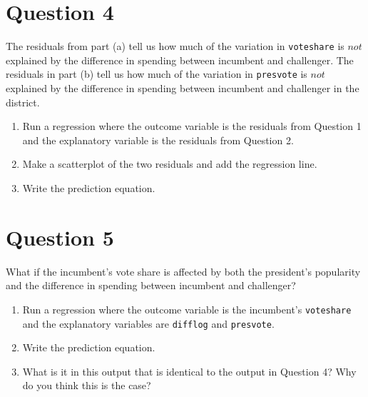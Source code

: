 \documentclass[12pt,letterpaper]{article}
\begin{document}
\section*{Question 4}
\noindent The residuals from part (a) tell us how much of the variation in \texttt{voteshare} is $not$ explained by the difference in spending between incumbent and challenger. The residuals in part (b) tell us how much of the variation in \texttt{presvote} is $not$ explained by the difference in spending between incumbent and challenger in the district.
	\begin{enumerate}
		\item Run a regression where the outcome variable is the residuals from Question 1 and the explanatory variable is the residuals from Question 2.	\vspace{6cm}
		\item Make a scatterplot of the two residuals and add the regression line. 	\vspace{6cm}
		\item Write the prediction equation.
	\end{enumerate}
	
	\newpage	

\section*{Question 5}
\noindent What if the incumbent's vote share is affected by both the president's popularity and the difference in spending between incumbent and challenger? 
	\begin{enumerate}
		\item Run a regression where the outcome variable is the incumbent's \texttt{voteshare} and the explanatory variables are \texttt{difflog} and \texttt{presvote}.	\vspace{5cm}
		\item Write the prediction equation.	\vspace{5cm}
		\item What is it in this output that is identical to the output in Question 4? Why do you think this is the case?
	\end{enumerate}
\end{document}
